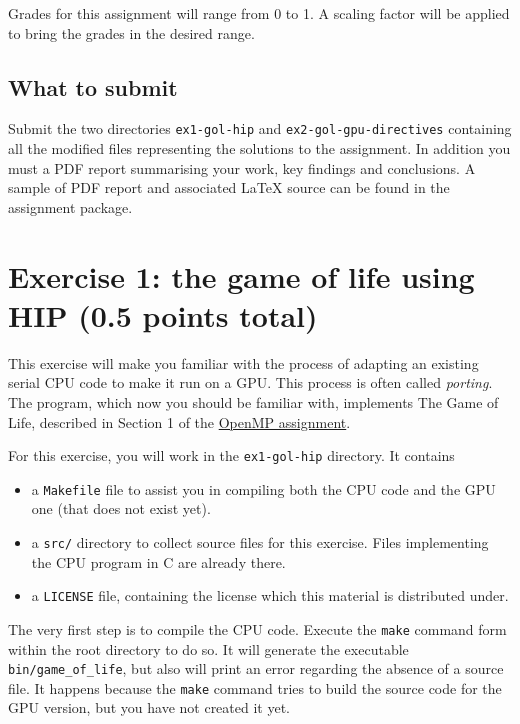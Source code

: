 \documentclass[a4paper, 11pt]{article}
\begin{document}
	Grades for this assignment will range from 0 to 1. A scaling factor will be applied to bring the grades in the desired range.

\subsection{What to submit}
Submit the two directories \texttt{ex1-gol-hip} and  \texttt{ex2-gol-gpu-directives} containing all the modified files representing the solutions to the assignment. In addition you must a PDF report summarising your work, key findings and conclusions. A sample of PDF report and associated LaTeX source can be found in the assignment package.

	\section{Exercise 1: the game of life using HIP (0.5 points total)}
	
	This exercise will make you familiar with the process of adapting an existing serial CPU code to make it run on a GPU. This process is often called \textit{porting}. The program, which now you should be familiar with, implements The Game of Life, described in Section 1 of the \href{https://pawsey.atlassian.net/wiki/download/attachments/51923133/HPC_Course_OpenMP_Assignment.pdf?api=v2}{OpenMP assignment}.
	
	For this exercise, you will work in the \texttt{ex1-gol-hip} directory. It contains 
	\begin{itemize}
		\item a \texttt{Makefile} file to assist you in compiling both the CPU code and the GPU one (that does not exist yet).
		\item a \texttt{src/} directory to collect source files for this exercise. Files implementing the CPU program in C are already there.
		\item a \texttt{LICENSE} file, containing the license which this material is distributed under.
	\end{itemize}
	
	The very first step is to compile the CPU code. Execute the \texttt{make} command form within the root directory to do so. It will generate the executable \texttt{bin/game\_of\_life}, but also will print an error regarding the absence of a source file. It happens because the \texttt{make} command tries to build the source code for the GPU version, but you have not created it yet.
	
\end{document}
